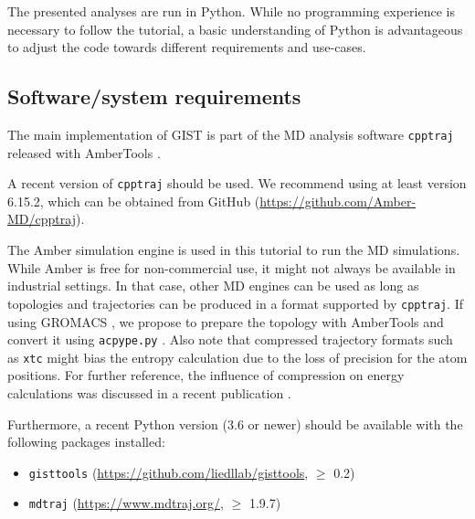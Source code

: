 \documentclass[9pt,tutorial]{livecoms}
\newcommand{\software}{\texttt}
\newcommand\inlinecode{\texttt}
\begin{document}
The presented analyses are run in Python.
While no programming experience is necessary to follow the tutorial, a basic understanding of Python is advantageous to adjust the code towards different requirements and use-cases.

\subsection{Software/system requirements}
The main implementation of GIST is part of the MD analysis software \software{cpptraj} released with AmberTools \cite{amber24, Case2023-ambertools}.

A recent version of \software{cpptraj} should be used. We recommend using at least version 6.15.2, which can be obtained from GitHub (\url{https://github.com/Amber-MD/cpptraj}).

The Amber simulation engine is used in this tutorial to run the MD simulations.
While Amber is free for non-commercial use, it might not always be available in industrial settings.
In that case, other MD engines can be used as long as topologies and trajectories can be produced in a format supported by \software{cpptraj}.
If using GROMACS \cite{Abraham2015-gromacs,Pronk2013-gromacs}, we propose to prepare the topology with AmberTools \cite{Case2023-ambertools} and convert it using \software{acpype.py} \cite{Sousa_da_Silva2012-acpype}.
Also note that compressed trajectory formats such as \inlinecode{xtc} might bias the entropy calculation due to the loss of precision for the atom positions. For further reference, the influence of compression on energy calculations was discussed in a recent publication \cite{Roe2022-compression}.

Furthermore, a recent Python version (3.6 or newer) should be available with the following packages installed:
\begin{itemize}
	\item \software{gisttools} (\url{https://github.com/liedllab/gisttools}, $\geq$ 0.2)
	\item \software{mdtraj} (\url{https://www.mdtraj.org/}, $\geq$ 1.9.7) \cite{McGibbon2015-mdtraj}
\end{itemize}
\end{document}
